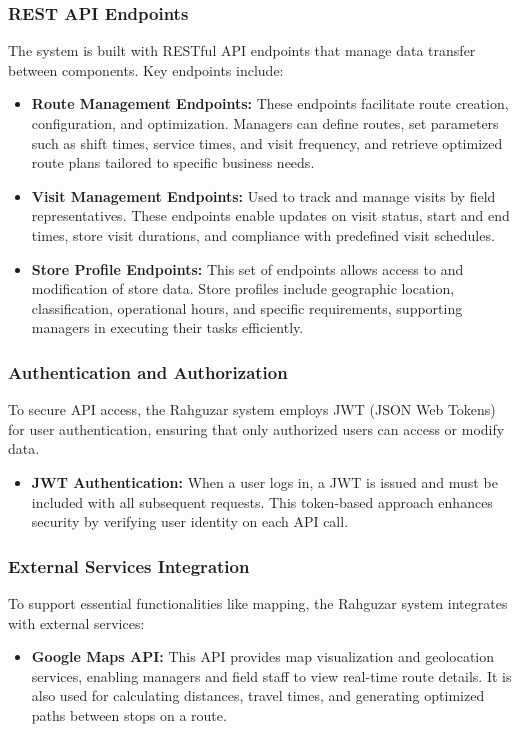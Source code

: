 \subsubsection{REST API Endpoints}
The system is built with RESTful API endpoints that manage data transfer between components. Key endpoints include:
\begin{itemize}
    \item \textbf{Route Management Endpoints:} These endpoints facilitate route creation, configuration, and optimization. Managers can define routes, set parameters such as shift times, service times, and visit frequency, and retrieve optimized route plans tailored to specific business needs.
    \item \textbf{Visit Management Endpoints:} Used to track and manage visits by field representatives. These endpoints enable updates on visit status, start and end times, store visit durations, and compliance with predefined visit schedules.
    \item \textbf{Store Profile Endpoints:} This set of endpoints allows access to and modification of store data. Store profiles include geographic location, classification, operational hours, and specific requirements, supporting managers in executing their tasks efficiently.
\end{itemize}

\subsubsection{Authentication and Authorization}
To secure API access, the Rahguzar system employs JWT (JSON Web Tokens) for user authentication, ensuring that only authorized users can access or modify data.
\begin{itemize}
    \item \textbf{JWT Authentication:} When a user logs in, a JWT is issued and must be included with all subsequent requests. This token-based approach enhances security by verifying user identity on each API call.
\end{itemize}

\subsubsection{External Services Integration}
To support essential functionalities like mapping, the Rahguzar system integrates with external services:
\begin{itemize}
    \item \textbf{Google Maps API:} This API provides map visualization and geolocation services, enabling managers and field staff to view real-time route details. It is also used for calculating distances, travel times, and generating optimized paths between stops on a route.
\end{itemize}

